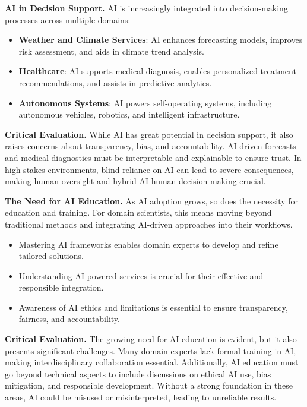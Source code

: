 \textbf{AI in Decision Support.} AI is increasingly integrated into decision-making processes across multiple domains:
\begin{itemize}
    \item \textbf{Weather and Climate Services}: AI enhances forecasting models, improves risk assessment, and aids in climate trend analysis.
    \item \textbf{Healthcare}: AI supports medical diagnosis, enables personalized treatment recommendations, and assists in predictive analytics.
    \item \textbf{Autonomous Systems}: AI powers self-operating systems, including autonomous vehicles, robotics, and intelligent infrastructure.
\end{itemize}

\textbf{Critical Evaluation.} While AI has great potential in decision support, it also raises concerns about transparency, bias, and accountability. AI-driven forecasts and medical diagnostics must be interpretable and explainable to ensure trust. In high-stakes environments, blind reliance on AI can lead to severe consequences, making human oversight and hybrid AI-human decision-making crucial.

\textbf{The Need for AI Education.} As AI adoption grows, so does the necessity for education and training. For domain scientists, this means moving beyond traditional methods and integrating AI-driven approaches into their workflows.

\begin{itemize}
    \item Mastering AI frameworks enables domain experts to develop and refine tailored solutions.
    \item Understanding AI-powered services is crucial for their effective and responsible integration.
    \item Awareness of AI ethics and limitations is essential to ensure transparency, fairness, and accountability.
\end{itemize}

\textbf{Critical Evaluation.} The growing need for AI education is evident, but it also presents significant challenges. Many domain experts lack formal training in AI, making interdisciplinary collaboration essential. Additionally, AI education must go beyond technical aspects to include discussions on ethical AI use, bias mitigation, and responsible development. Without a strong foundation in these areas, AI could be misused or misinterpreted, leading to unreliable results. 

